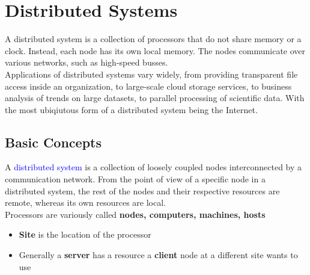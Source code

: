 \documentclass{book}
\begin{document}
    \chapter{Distributed Systems}
        A distributed system is a collection of processors that do not share memory or
        a clock. Instead, each node has its own local memory. The nodes communicate over 
        various networks, such as high-speed busses.\\
        Applications of distributed systems vary widely, from providing transparent file access
        inside an organization, to large-scale cloud storage services, to business analysis of 
        trends on large datasets, to parallel processing of scientific data. With the most 
        ubiqiutous form of a distributed system being the Internet.
        \section{Basic Concepts}
            A \textcolor{blue}{distributed system} is a collection of loosely coupled nodes
            interconnected by a communication network. From the point of view of a specific node
            in a distributed system, the rest of the nodes and their respective resources are remote,
            whereas its own resources are local.\\
            Processors are variously called \textbf{nodes, computers, machines, hosts}\\
            \begin{itemize}
                \item \textbf{Site} is the location of the processor
                \item Generally a \textbf{server} has a resource a \textbf{client} node at a different
                site wants to use
            \end{itemize}
\end{document}
